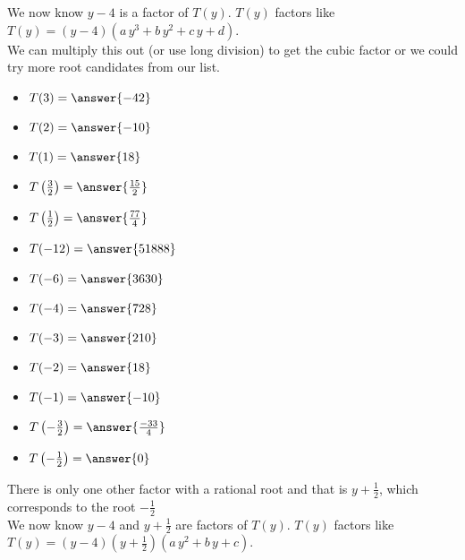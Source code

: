 \documentclass{ximera}
\begin{document}
\begin{example}
We now know $y-4$ is a factor of $T(y)$.  $T(y)$ factors like $T(y) = (y-4) (a \, y^3 + b \, y^2 + c \, y + d)$. \\

We can  multiply this out (or use long division) to get the cubic factor or we could try more root candidates from our list.


\begin{itemize}
\item $T(3) =  \answer{-42}$  \\
\item $T(2) =  \answer{-10}$  \\
\item $T(1) =  \answer{18}$  \\
\item $T\left(\tfrac{3}{2}\right) =  \answer{\frac{15}{2}}$  \\
\item $T\left(\tfrac{1}{2}\right) =  \answer{\frac{77}{4}}$  \\
\item $T(-12) =  \answer{51888}$  \\
\item $T(-6) =  \answer{3630}$  \\
\item $T(-4) =  \answer{728}$  \\
\item $T(-3) =  \answer{210}$  \\
\item $T(-2) =  \answer{18}$  \\
\item $T(-1) =  \answer{-10}$  \\
\item $T\left(-\tfrac{3}{2}\right) =  \answer{\frac{-33}{4}}$  \\
\item $T\left(-\tfrac{1}{2}\right) =  \answer{0}$  
\end{itemize}

There is only one other factor with a rational root and that is $y+\frac{1}{2}$, which corresponds to the root $-\frac{1}{2}$ \\



We now know $y-4$ and $y+\frac{1}{2}$ are factors of $T(y)$.  $T(y)$ factors like $T(y) = (y-4) \left(y+\frac{1}{2}\right) (a \, y^2 + b \, y + c)$. \\





\end{example}
\end{document}
